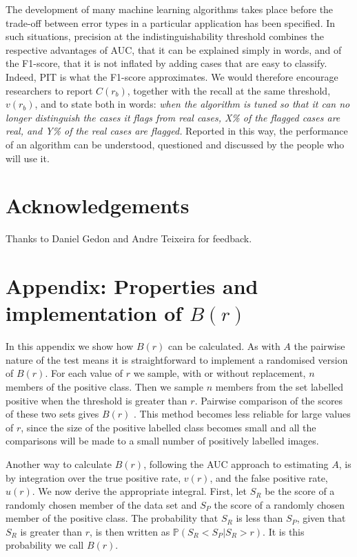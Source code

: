 \documentclass[preprint,12pt]{article}
\newcommand{\prob}{\mathbb{P}}  %
\begin{document}
The development of many machine learning algorithms takes place before the trade-off between error types in a particular application has been specified. In such situations, precision at the indistinguishability threshold combines the respective advantages of AUC, that it can be explained simply in words, and of the F1-score, that it is not inflated by adding cases that are easy to classify. Indeed, PIT is what the F1-score approximates. We would therefore encourage researchers to report $C(r_b)$, together with the recall at the same threshold, $v(r_b)$, and to state both in words: {\it when the algorithm is tuned so that it can no longer distinguish the cases it flags from real cases, X\% of the flagged cases are real, and Y\% of the real cases are flagged.} Reported in this way, the performance of an algorithm can be understood, questioned and discussed by the people who will use it.

\section*{Acknowledgements}

Thanks to Daniel Gedon and Andre Teixeira for feedback. 

\section*{Appendix: Properties and implementation of $B(r)$}
\label{app:B}

In this appendix we show how $B(r)$ can be calculated. As with $A$ the pairwise nature of the test means it is straightforward to implement a randomised version of $B(r)$. For each value of $r$ we sample, with or without replacement, $n$ members of the positive class. Then we sample $n$ members from the set labelled positive when the threshold is greater than $r$. Pairwise comparison of the scores of these two sets gives $B(r)$ . This method becomes less reliable for large values of $r$, since the size of the positive labelled class becomes small and all the comparisons will be made to a small number of positively labelled images. 

Another way to calculate $B(r)$, following the AUC approach to estimating $A$, is by integration over the true positive rate, $v(r)$, and the false positive rate, $u(r)$. We now derive the appropriate integral. First, let $S_R$ be the score of a randomly chosen member of the data set and $S_P$ the score of a randomly chosen member of the positive class. The probability that $S_R$ is less than $S_P$, given that $S_R$ is greater than $r$, is then written as $\prob(S_R<S_P | S_R>r)$. It is this probability we call $B(r)$.
\end{document}
